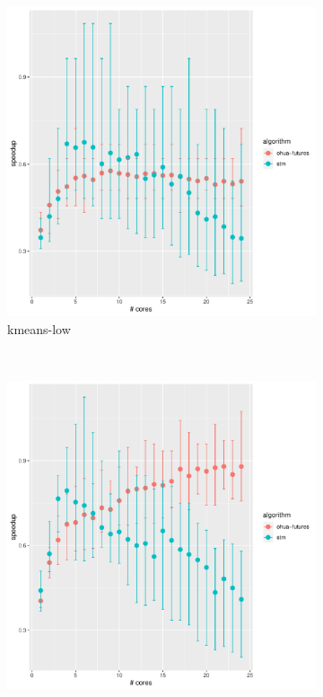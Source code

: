 \begin{figure}
    \begin{subfigure}[t]{.32\textwidth}
        \includegraphics[width=\textwidth,keepaspectratio]{gfx/results/kmeans/kmeans-low}
        \caption{kmeans-low}%
    \end{subfigure}%
    ~
    \begin{subfigure}[t]{.32\textwidth}
        \includegraphics[width=\textwidth,keepaspectratio]{gfx/results/kmeans/kmeans-low+}

\end{subfigure}
\end{figure}
